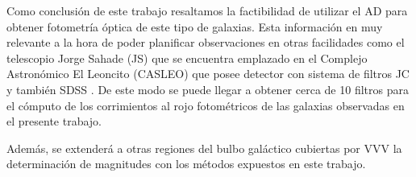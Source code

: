 \documentclass[baaa]{baaa}
\begin{document}
Como conclusión de este trabajo resaltamos la factibilidad de utilizar el AD para obtener fotometría óptica de este tipo de galaxias. Esta información en muy relevante a la hora de poder planificar observaciones en otras facilidades como el telescopio Jorge Sahade (JS) que se encuentra emplazado en el Complejo Astronómico El Leoncito (CASLEO) que posee detector con sistema de filtros JC y también SDSS \citep{sloan-ref}. De este modo se puede llegar a obtener cerca de 10 filtros para el cómputo de los corrimientos al rojo fotométricos de las galaxias observadas en el presente trabajo.

Además, se extenderá a otras regiones del bulbo galáctico cubiertas por VVV la determinación de magnitudes con los métodos expuestos en este trabajo.




\small

 
\end{document}
